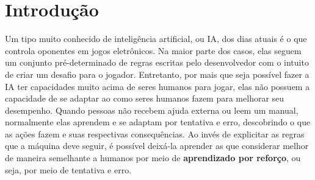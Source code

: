 
\chapter{Introdução}
\label{cap:introducao}


Um tipo muito conhecido de inteligência artificial, ou IA, dos dias atuais é o que controla oponentes em jogos eletrônicos.
Na maior parte dos casos, elas seguem um conjunto pré-determinado de regras escritas pelo desenvolvedor com o intuito de criar um desafio para o jogador.
Entretanto, por mais que seja possível fazer a IA ter capacidades muito acima de seres humanos para jogar, elas não possuem a capacidade de se adaptar ao como seres humanos fazem para melhorar seu desempenho.
Quando pessoas não recebem ajuda externa ou leem um manual, normalmente elas aprendem e se adaptam por tentativa e erro, descobrindo o que as ações fazem e suas respectivas consequências.
Ao invés de explicitar as regras que a máquina deve seguir, é possível deixá-la aprender as que considerar melhor de maneira semelhante a humanos por meio de \textbf{aprendizado por reforço}, ou seja, por meio de tentativa e erro.



